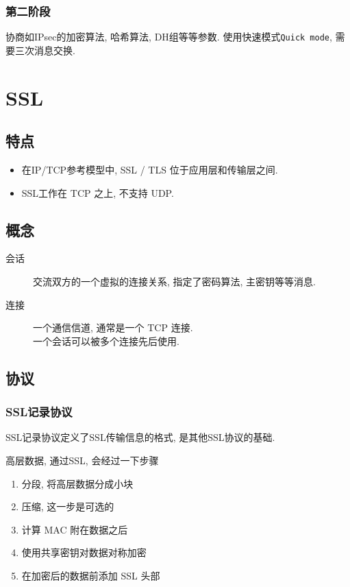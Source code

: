 \documentclass{ctexart}
\begin{document}
\subsubsection{第二阶段}
    协商如IPsec的加密算法, 哈希算法, DH组等等参数.
    使用快速模式\verb/Quick mode/, 需要三次消息交换.

\section{SSL}
\subsection{特点}
    \begin{itemize}
        \item 在IP/TCP参考模型中, SSL / TLS 位于应用层和传输层之间.
        \item SSL工作在 TCP 之上, 不支持 UDP.
    \end{itemize}
\subsection{概念}
    \begin{description}
        \item[会话] 交流双方的一个虚拟的连接关系, 指定了密码算法, 主密钥等等消息.
        \item[连接] 一个通信信道, 通常是一个 TCP 连接.\\
            一个会话可以被多个连接先后使用.
    \end{description}
\subsection{协议}
\subsubsection{SSL记录协议} SSL记录协议定义了SSL传输信息的格式, 是其他SSL协议的基础.\par
    高层数据, 通过SSL, 会经过一下步骤 \begin{enumerate}
        \item 分段, 将高层数据分成小块
        \item 压缩, 这一步是可选的
        \item 计算 MAC 附在数据之后
        \item 使用共享密钥对数据对称加密
        \item 在加密后的数据前添加 SSL 头部
    \end{enumerate}
\end{document}
